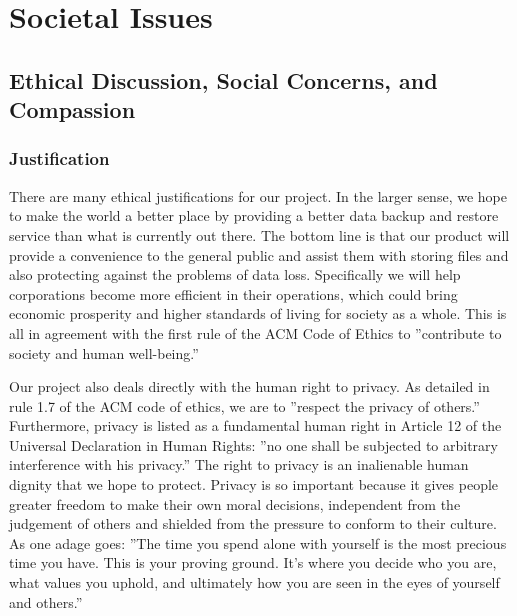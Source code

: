 \chapter{Societal Issues}

\section{Ethical Discussion, Social Concerns, and Compassion}

\subsection{Justification}
	There are many ethical justifications for our project.  In the larger sense, we hope to make the world a better place by providing a better data backup and restore service than what is currently out there.  The bottom line is that our product will provide a convenience to the general public and assist them with storing files and also protecting against the problems of data loss.  Specifically we will help corporations become more efficient in their operations, which could bring economic prosperity and higher standards of living for society as a whole.  This is all in agreement with the first rule of the ACM Code of Ethics to ''contribute to society and human well-being.'' \cite{acmethics}

	Our project also deals directly with the human right to privacy.  As detailed in rule 1.7 of the ACM code of ethics, we are to ''respect the privacy of others.'' \cite{acmethics}  Furthermore, privacy is listed as a fundamental human right in Article 12 of the Universal Declaration in Human Rights: ''no one shall be subjected to arbitrary interference with his privacy.'' \cite{udhr}  The right to privacy is an inalienable human dignity that we hope to protect.  Privacy is so important because it gives people greater freedom to make their own moral decisions, independent from the judgement of others and shielded from the pressure to conform to their culture.  As one adage goes: ''The time you spend alone with yourself is the most precious time you have.  This is your proving ground.  It’s where you decide who you are, what values you uphold, and ultimately how you are seen in the eyes of yourself and others.'' \cite{wolf}

